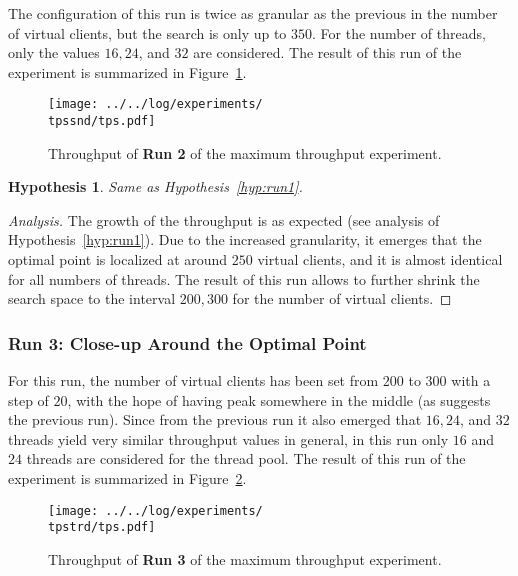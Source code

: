 \documentclass[11pt]{article}
\newtheorem{hyp}{Hypothesis}
\theoremstyle{definition}
\newenvironment{ana}[1][\proofname]{\begin{proof}[Analysis]}{\end{proof}}
\newcommand\gr[1]{{\color[HTML]{11aa11}#1}}
\newcommand\bl[1]{{\color[HTML]{1111dd}#1}}
\newcommand\plotscale{1.2}
\newcommand\tpssnd{03_maximum_throughput_16-11-11_21:56:33}
\newcommand\tpstrd{03_maximum_throughput_16-11-12_12:07:39}
\begin{document}
The configuration of this run is twice as granular as the previous in the number of virtual clients, but the search is only up to $350$.
For the number of threads, only the values $16,24$, and $32$ are considered.
The result of this run of the experiment is summarized in Figure~\ref{fig:tps2}.

\begin{figure}[!h]
    \centering
    \texttt{[image: ../../log/experiments/\\tpssnd/tps.pdf]}
    \caption{Throughput of \gr{\bf Run 2} of the maximum throughput experiment.}
    \label{fig:tps2}
\end{figure}

\begin{hyp}
    Same as Hypothesis~\ref{hyp:run1}.
\end{hyp}
\begin{ana}
    The growth of the throughput is as expected (see analysis of Hypothesis~\ref{hyp:run1}).
    Due to the increased granularity, it emerges that the optimal point is localized at around $250$ virtual clients, and it is almost identical for all numbers of threads.
    The result of this run allows to further shrink the search space to the interval $200,300$ for the number of virtual clients.
\end{ana}

\subsubsection{\bl{Run 3}: Close-up Around the Optimal Point}

For this run, the number of virtual clients has been set from $200$ to $300$ with a step of $20$, with the hope of having peak somewhere in the middle (as suggests the previous run).
Since from the previous run it also emerged that $16,24$, and $32$ threads yield very similar throughput values in general, in this run only $16$ and $24$ threads are considered for the thread pool.
The result of this run of the experiment is summarized in Figure~\ref{fig:tps3}.

\begin{figure}[!h]
    \centering
    \texttt{[image: ../../log/experiments/\\tpstrd/tps.pdf]}
    \caption{Throughput of \bl{\bf Run 3} of the maximum throughput experiment.}
    \label{fig:tps3}
\end{figure}
\end{document}
